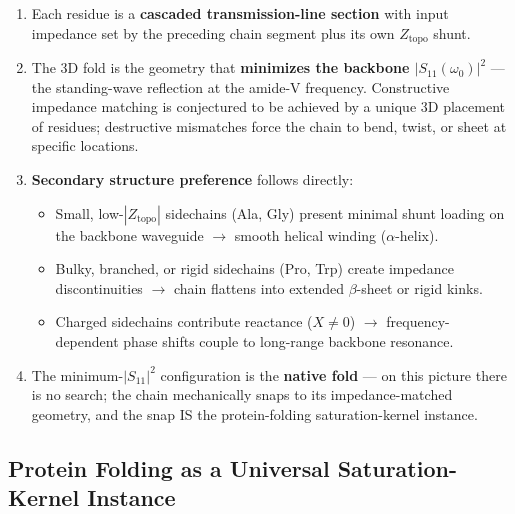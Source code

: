 \begin{enumerate}
    \item Each residue is a \textbf{cascaded transmission-line section} with input impedance set by the preceding chain segment plus its own $Z_{\text{topo}}$ shunt.
    \item The 3D fold is the geometry that \textbf{minimizes the backbone $|S_{11}(\omega_0)|^2$} --- the standing-wave reflection at the amide-V frequency. Constructive impedance matching is conjectured to be achieved by a unique 3D placement of residues; destructive mismatches force the chain to bend, twist, or sheet at specific locations.
    \item \textbf{Secondary structure preference} follows directly:
    \begin{itemize}
        \item Small, low-$|Z_{\text{topo}}|$ sidechains (Ala, Gly) present minimal shunt loading on the backbone waveguide $\to$ smooth helical winding ($\alpha$-helix).
        \item Bulky, branched, or rigid sidechains (Pro, Trp) create impedance discontinuities $\to$ chain flattens into extended $\beta$-sheet or rigid kinks.
        \item Charged sidechains contribute reactance ($X \neq 0$) $\to$ frequency-dependent phase shifts couple to long-range backbone resonance.
    \end{itemize}
    \item The minimum-$|S_{11}|^2$ configuration is the \textbf{native fold} --- on this picture there is no search; the chain mechanically snaps to its impedance-matched geometry, and the snap IS the protein-folding saturation-kernel instance.
\end{enumerate}

\subsection{Protein Folding as a Universal Saturation-Kernel Instance}

